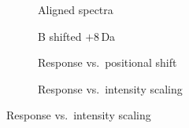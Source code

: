 \begin{figure}[p]
    \centering
    \begin{subfigure}[t]{0.48\linewidth}
        \centering
        \resizebox{\linewidth}{!}{}
        \caption{Aligned spectra}
        \label{fig:cosine-wasserstein-a}
    \end{subfigure}
    \hfill
    \begin{subfigure}[t]{0.48\linewidth}
        \centering
        \resizebox{\linewidth}{!}{}
        \caption{B shifted $+8$\,Da}
        \label{fig:cosine-wasserstein-b}
    \end{subfigure}

    \medskip

    \begin{subfigure}[t]{0.48\linewidth}
        \centering
        \resizebox{\linewidth}{!}{}
        \caption{Response vs.\ positional shift}
        \label{fig:cosine-wasserstein-c}
    \end{subfigure}
    \hfill
    \begin{subfigure}[t]{0.48\linewidth}
        \centering
        \resizebox{\linewidth}{!}{}
        \caption{Response vs.\ intensity scaling}
        \label{fig:cosine-wasserstein-d}
    \end{subfigure}


\end{figure}
